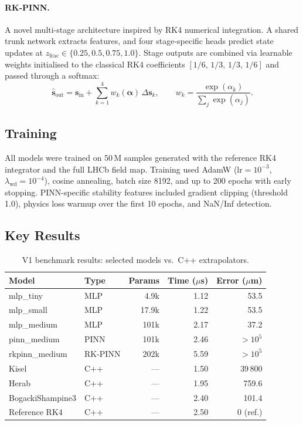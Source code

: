 \documentclass[12pt,a4paper]{article}
\newcommand{\vb}[1]{\bm{#1}}
\begin{document}
\paragraph{RK-PINN.} A novel multi-stage architecture inspired by RK4 numerical integration. A shared trunk network extracts features, and four stage-specific heads predict state updates at $z_{\text{frac}} \in \{0.25, 0.5, 0.75, 1.0\}$. Stage outputs are combined via learnable weights initialised to the classical RK4 coefficients $[1/6,\,1/3,\,1/3,\,1/6]$ and passed through a softmax:
\begin{equation}
\hat{\vb{s}}_{\text{out}} = \vb{s}_{\text{in}} + \sum_{k=1}^{4} w_k(\boldsymbol{\alpha})\,\Delta\vb{s}_k, \qquad w_k = \frac{\exp(\alpha_k)}{\sum_j \exp(\alpha_j)}.
\label{eq:rkpinn}
\end{equation}

\subsection{Training}

All models were trained on 50\,M samples generated with the reference RK4 integrator and the full LHCb field map. Training used AdamW ($\text{lr}=10^{-3}$, $\lambda_{\text{wd}}=10^{-4}$), cosine annealing, batch size 8192, and up to 200 epochs with early stopping. PINN-specific stability features included gradient clipping (threshold 1.0), physics loss warmup over the first 10 epochs, and NaN/Inf detection.

\subsection{Key Results}

\begin{table}[h]
\centering
\caption{V1 benchmark results: selected models vs.\ C++ extrapolators.}
\label{tab:v1_results}
\begin{tabular}{llrrr}
\toprule
\textbf{Model} & \textbf{Type} & \textbf{Params} & \textbf{Time ($\mu$s)} & \textbf{Error ($\mu$m)} \\
\midrule
mlp\_tiny       & MLP     & 4.9k  & 1.12 & 53.5 \\
mlp\_small      & MLP     & 17.9k & 1.22 & 53.5 \\
mlp\_medium     & MLP     & 101k  & 2.17 & 37.2 \\
pinn\_medium    & PINN    & 101k  & 2.46 & $>10^5$ \\
rkpinn\_medium  & RK-PINN & 202k  & 5.59 & $>10^5$ \\
\midrule
Kisel           & C++     & ---   & 1.50 & 39\,800 \\
Herab           & C++     & ---   & 1.95 & 759.6  \\
BogackiShampine3& C++     & ---   & 2.40 & 101.4  \\
Reference RK4   & C++     & ---   & 2.50 & 0 (ref.) \\
\bottomrule
\end{tabular}
\end{table}
\end{document}
